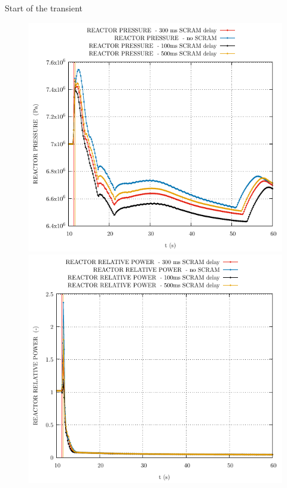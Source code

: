 \begin{frame}{Start of the transient}
\begin{figure}
\begin{minipage}{.5\textwidth}
		\includegraphics[width=0.7\linewidth]{./graphs/REACTOR PRESSURE _comp.pdf}
	\end{minipage}%
	\begin{minipage}{.5\textwidth}
		\centering
		\includegraphics[width=.7\linewidth]{./graphs/REACTOR RELATIVE POWER _comp.pdf}
	\end{minipage}
\end{figure}
\end{frame}


